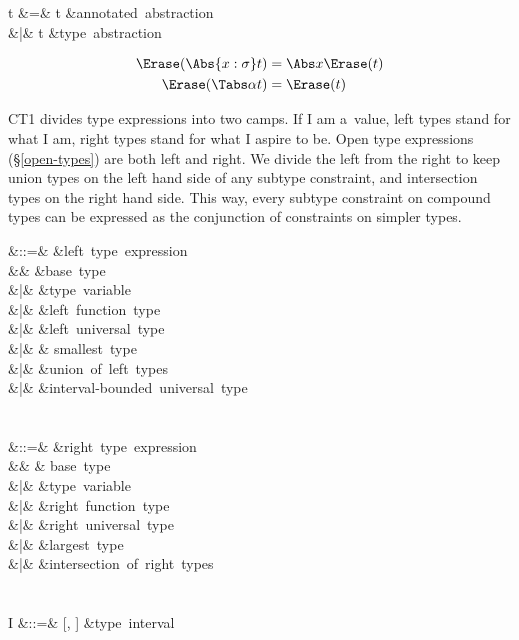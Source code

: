 \documentclass{amsart}
\begin{document}

\begin{syntax}
t &\+=& t &\mbox{annotated abstraction}\\
&|& \Tabs\alpha t &\mbox{type abstraction}
\end{syntax}%

\begin{align*}
\Erase(\Abs{x:\sigma}t) & = \Abs x\Erase(t)\\
\Erase(\Tabs\alpha t) &= \Erase(t)
\end{align*}


CT1 divides type expressions into two camps. If I am a~value,
left types stand for what I am, right types stand for what I
aspire to be. Open type expressions (\S\ref{open-types}) are both
left and right. We divide the left from the right to keep union
types on the left hand side of any subtype constraint, and
intersection types on the right hand side. This way, every
subtype constraint on compound types can be expressed as the
conjunction of constraints on simpler types.

\begin{syntax}
\rho &::=& &\mbox{left type expression}\\
&& \iota &\mbox{base type}\\
&|& \alpha &\mbox{type variable}\\
&|& \tau \R \rho &\mbox{left function type}\\
&|& \All\alpha\rho &\mbox{left universal type}\\
&|& \Bot & \mbox{smallest type}\\
&|& \rho\cup\rho &\mbox{union of left types}\\
&|& \rho &\mbox{interval-bounded universal type}\\
\\\\
\tau &::=& &\mbox{right type expression}\\
&& \iota & \mbox{base type}\\
&|& \alpha &\mbox{type variable}\\
&|& \rho \R \tau &\mbox{right function type}\\
&|& \All\alpha\tau &\mbox{right universal type}\\
&|& \Top &\mbox{largest type}\\
&|& \tau\cap\tau &\mbox{intersection of right types}\\
\\\\
I &::=& [\rho, \tau] &\mbox{type interval}
\end{syntax}%
\end{document}
